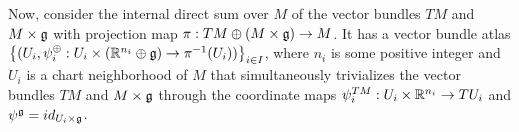 Now, consider the internal direct sum over $M$ of the vector bundles $TM$ and $M \times \mathfrak{g}$ with projection map $\pi: TM \oplus (M \times \mathfrak{g}) \to M$. %
It has a vector bundle atlas $\left\{ (U_i, \psi^\oplus_i: U_i \times (\mathbb{R}^{n_i} \oplus \mathfrak{g}) \to \pi^{-1}(U_i) ) \right\}_{i \in I}$, where $n_i$ is some positive integer and $U_i$ is a chart neighborhood of $M$ that simultaneously trivializes the vector bundles $TM$ and $M \times \mathfrak{g}$ through the coordinate maps $\psi^{TM}_i: U_i \times \mathbb{R}^{n_i} \to TU_i$  and $\psi^{\mathfrak{g}} = id_{U_i \times \mathfrak{g}}$.

